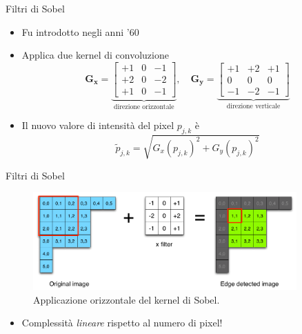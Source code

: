 \documentclass{beamer}
\begin{document}
	\begin{frame}{Filtri di Sobel}
		\begin{itemize}
			\item Fu introdotto negli anni '60 \cite{SobelFeldman1968IsotropicGradient}
			\item Applica due kernel di convoluzione
				\[
				\mathbf{G_x} =
				\underbrace{
				\begin{bmatrix}
					+1 & 0 & -1 \\
					+2 & 0 & -2 \\
					+1 & 0 & -1
				\end{bmatrix}
				}_{\text{direzione orizzontale}}
				,\quad
				\mathbf{G_y} =
				\underbrace{
				\begin{bmatrix}
					+1 & +2 & +1 \\
					0 & 0 & 0 \\
					-1 & -2 & -1
				\end{bmatrix}
				}_{\text{direzione verticale}
				}
				\]
			\item<2-> Il nuovo valore di intensità del pixel $p_{j,k}$ è
			\[
				\tilde{p}_{j,k} = \sqrt{{G_x(p_{j,k})}^2 + {G_y(p_{j,k})}^2}
			\]
		\end{itemize}
	\end{frame}

	\begin{frame}{Filtri di Sobel}
		\begin{figure}
			\begin{center}
				\includegraphics[width=0.9\textwidth]{sobel-appl.png}
			\end{center}
			\caption{Applicazione orizzontale del kernel di Sobel.}\label{fig:sobel-appl}
		\end{figure}
		
		\begin{itemize}
			\item Complessità \emph{lineare} rispetto al numero di pixel!
		\end{itemize}
	\end{frame}
\end{document}

